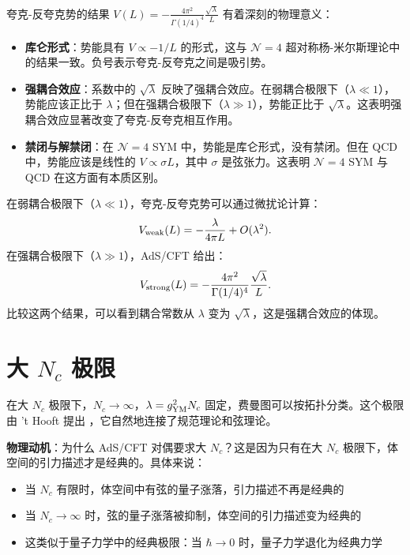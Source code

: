 夸克-反夸克势的结果 $V(L) = -\frac{4\pi^2}{\Gamma(1/4)^4} \frac{\sqrt{\lambda}}{L}$ 有着深刻的物理意义：

\begin{note}[库仑势与强耦合效应]
\begin{itemize}
    \item \textbf{库仑形式}：势能具有 $V \propto -1/L$ 的形式，这与 $\mathcal{N}=4$ 超对称杨-米尔斯理论中的结果一致。负号表示夸克-反夸克之间是吸引势。
    \item \textbf{强耦合效应}：系数中的 $\sqrt{\lambda}$ 反映了强耦合效应。在弱耦合极限下（$\lambda \ll 1$），势能应该正比于 $\lambda$；但在强耦合极限下（$\lambda \gg 1$），势能正比于 $\sqrt{\lambda}$。这表明强耦合效应显著改变了夸克-反夸克相互作用。
    \item \textbf{禁闭与解禁闭}：在 $\mathcal{N}=4$ SYM 中，势能是库仑形式，没有禁闭。但在 QCD 中，势能应该是线性的 $V \propto \sigma L$，其中 $\sigma$ 是弦张力。这表明 $\mathcal{N}=4$ SYM 与 QCD 在这方面有本质区别。
\end{itemize}
\end{note}

\begin{example}[强耦合与弱耦合的对比]
在弱耦合极限下（$\lambda \ll 1$），夸克-反夸克势可以通过微扰论计算：
\begin{equation}
    V_{\rm weak}(L) = -\frac{\lambda}{4\pi L} + O(\lambda^2).
\end{equation}
在强耦合极限下（$\lambda \gg 1$），AdS/CFT 给出：
\begin{equation}
    V_{\rm strong}(L) = -\frac{4\pi^2}{\Gamma(1/4)^4} \frac{\sqrt{\lambda}}{L}.
\end{equation}
比较这两个结果，可以看到耦合常数从 $\lambda$ 变为 $\sqrt{\lambda}$，这是强耦合效应的体现。
\end{example}

\section{大 $N_c$ 极限}

在大 $N_c$ 极限下，$N_c \to \infty$，$\lambda = g_{\rm YM}^2 N_c$ 固定，费曼图可以按拓扑分类。这个极限由 't Hooft 提出 \cite{tHooft1974}，它自然地连接了规范理论和弦理论。

\textbf{物理动机}：为什么 AdS/CFT 对偶要求大 $N_c$？这是因为只有在大 $N_c$ 极限下，体空间的引力描述才是经典的。具体来说：
\begin{itemize}
    \item 当 $N_c$ 有限时，体空间中有弦的量子涨落，引力描述不再是经典的
    \item 当 $N_c \to \infty$ 时，弦的量子涨落被抑制，体空间的引力描述变为经典的
    \item 这类似于量子力学中的经典极限：当 $\hbar \to 0$ 时，量子力学退化为经典力学
\end{itemize}

